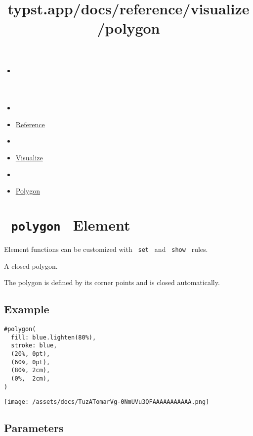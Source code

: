 \title{typst.app/docs/reference/visualize/polygon}

\begin{itemize}
\tightlist
\item
  \href{/docs}{}
\item
  
\item
  \href{/docs/reference/}{Reference}
\item
  
\item
  \href{/docs/reference/visualize/}{Visualize}
\item
  
\item
  \href{/docs/reference/visualize/polygon/}{Polygon}
\end{itemize}

\section{\texorpdfstring{\texttt{\ polygon\ } {{ Element
}}}{ polygon   Element }}\label{summary}

\label{element-tooltip}
Element functions can be customized with \texttt{\ set\ } and
\texttt{\ show\ } rules.

A closed polygon.

The polygon is defined by its corner points and is closed automatically.

\subsection{Example}\label{example}

\begin{verbatim}
#polygon(
  fill: blue.lighten(80%),
  stroke: blue,
  (20%, 0pt),
  (60%, 0pt),
  (80%, 2cm),
  (0%,  2cm),
)
\end{verbatim}

\texttt{[image: /assets/docs/TuzATomarVg-0NmUVu3QFAAAAAAAAAAA.png]}

\subsection{\texorpdfstring{{ Parameters
}}{ Parameters }}\label{parameters}

